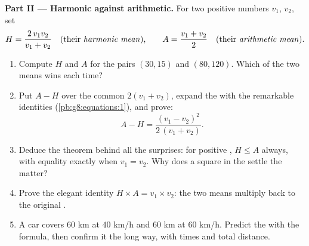 \begin{problem}
\medskip
\noindent\textbf{Part II --- Harmonic against arithmetic.}
For two positive numbers $v_1$, $v_2$, set
\[
H = \frac{2\, v_1 v_2}{v_1 + v_2}
\quad\text{(their \emph{harmonic mean}),}
\qquad
A = \frac{v_1 + v_2}{2}
\quad\text{(their \emph{arithmetic mean}).}
\]
\begin{enumerate}[resume]
  \item Compute $H$ and $A$ for the pairs $(30, 15)$ and
        $(80, 120)$. Which of the two means wins each time?
  \item Put $A - H$ over the common  $2(v_1 + v_2)$,
        expand the  with the remarkable identities
        (\cref{pb:g8:equations:1}), and prove:
        \[
        A - H = \frac{(v_1 - v_2)^2}{2\,(v_1 + v_2)} .
        \]
  \item Deduce the theorem behind all the surprises: for positive
        , $H \leq A$ always, with equality exactly when
        $v_1 = v_2$. Why does a square in the  settle
        the matter?
  \item Prove the elegant identity $H \times A = v_1 \times v_2$:
        the two means multiply back to the original .
  \item A car covers $60$ km at $40$ km/h and $60$ km at
        $60$ km/h. Predict the  with the formula,
        then confirm it the long way, with times and total
        distance.
\end{enumerate}


\end{problem}
